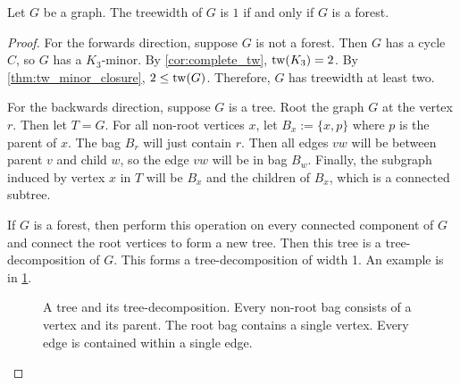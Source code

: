 \begin{proposition}\label{lem:treewidth_forest}
	Let $G$ be a graph. The treewidth of $G$ is $1$ if and only if \(G\) is a forest.
\end{proposition}

\begin{proof}
	For the forwards direction, suppose $G$ is not a forest. Then \(G\) has a cycle \(C\), so $G$ has a $K_3$-minor. By \cref{cor:complete_tw}, $\operatorname{tw}(K_3) = 2$. By \cref{thm:tw_minor_closure}, $2 \leq \operatorname{tw}(G)$. Therefore, $G$ has treewidth at least two. 

	For the backwards direction, suppose \(G\) is a tree. Root the graph \(G\) at the vertex \(r\). Then let \(T = G\). For all non-root vertices $x$, let \(B_x:= \lbrace x, p \rbrace\) where \(p\) is the parent of \(x\). The bag \(B_r\) will just contain \(r\). Then all edges \(vw\) will be between parent \(v\) and child \(w\), so the edge $vw$ will be in bag \(B_w\). Finally, the subgraph induced by vertex \(x\) in \(T\) will be \(B_x\) and the children of \(B_x\), which is a connected subtree.

	If \(G\) is a forest, then perform this operation on every connected component of \(G\) and connect the root vertices to form a new tree. Then this tree is a tree-decomposition of $G$. This forms a tree-decomposition of width 1. An example is in \cref{fig:tree-treedecomp}.
	\begin{figure}[ht]
		\centering
		
		
		\caption[Tree-Decomposition of a tree]{A tree and its tree-decomposition. Every non-root bag consists of a vertex and its parent. The root bag contains a single vertex. Every edge is contained within a single edge.}\label{fig:tree-treedecomp}
	\end{figure}
\end{proof}

